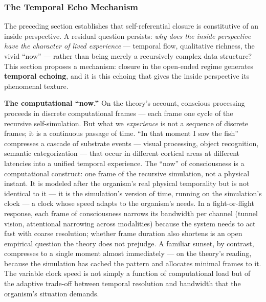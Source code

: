 \documentclass[12pt]{article}
\newcommand{\revstart}{}
\begin{document}
{\revstart\subsubsection{The Temporal Echo Mechanism}

The preceding section establishes that self-referential closure is constitutive of an inside perspective. A residual question persists: \emph{why does the inside perspective have the character of lived experience} --- temporal flow, qualitative richness, the vivid ``now'' --- rather than being merely a recursively complex data structure? This section proposes a mechanism: closure in the open-ended regime generates \textbf{temporal echoing}, and it is this echoing that gives the inside perspective its phenomenal texture.

\textbf{The computational ``now.''} On the theory's account, conscious processing proceeds in discrete computational frames --- each frame one cycle of the recursive self-simulation. But what we \emph{experience} is not a sequence of discrete frames; it is a continuous passage of time. ``In that moment I saw the fish'' compresses a cascade of substrate events --- visual processing, object recognition, semantic categorization --- that occur in different cortical areas at different latencies into a unified temporal experience. The ``now'' of consciousness is a computational construct: one frame of the recursive simulation, not a physical instant. It is modeled after the organism's real physical temporality but is not identical to it --- it is the simulation's version of time, running on the simulation's clock --- a clock whose speed adapts to the organism's needs. In a fight-or-flight response, each frame of consciousness narrows its bandwidth per channel (tunnel vision, attentional narrowing across modalities) because the system needs to act fast with coarse resolution; whether frame duration also shortens is an open empirical question the theory does not prejudge. A familiar sunset, by contrast, compresses to a single moment almost immediately — on the theory's reading, because the simulation has cached the pattern and allocates minimal frames to it. The variable clock speed is not simply a function of computational load but of the adaptive trade-off between temporal resolution and bandwidth that the organism's situation demands.

}
\end{document}
